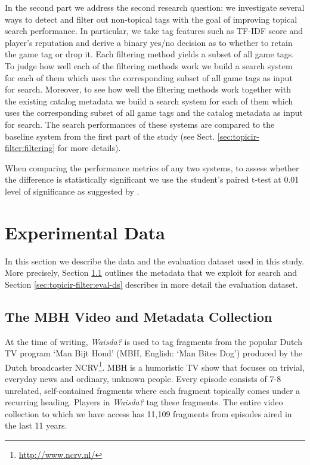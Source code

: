 In the second part we address the second research question: we investigate several ways to detect and filter out non-topical tags with the goal of improving topical search performance. In particular, we take tag features such as TF-IDF score and player's reputation and derive a binary yes/no decision as to whether to retain the game tag or drop it. Each filtering method yields a subset of all game tags. To judge how well each of the filtering methods work we build a search system for each of them which uses the corresponding subset of all game tags as input for search. Moreover, to see how well the filtering methods work together with the existing catalog metadata we build a search system for each of them which uses the corresponding subset of all game tags and the catalog metadata as input for search. The search performances of these systems are compared to the baseline system from the first part of the study (see Sect. \ref{sec:topicir-filter:filtering} for more details).

When comparing the performance metrics of any two systems, to assess whether the difference is statistically significant we use the student's paired t-test at 0.01 level of significance as suggested by \cite{stat-sig}.

\section{Experimental Data}
In this section we describe the data and the evaluation dataset used in this study. More precisely, Section \ref{sec:topicir-filter:video-metadata-collection} outlines the metadata that we exploit for search and Section \ref{sec:topicir-filter:eval-ds} describes in more detail the evaluation dataset.

\subsection{The MBH Video and Metadata Collection}\label{sec:topicir-filter:video-metadata-collection}
At the time of writing, \textit{Waisda?} is used to %
tag fragments from the popular Dutch TV program `Man Bijt Hond' (MBH, English: `Man Bites Dog') produced by the Dutch broadcaster NCRV\footnote{\url{http://www.ncrv.nl/}}.  MBH is a humoristic TV show that focuses on trivial, everyday news and ordinary, unknown people.  Every episode consists of 7-8 unrelated, self-contained fragments where each fragment topically comes under a recurring heading. Players in \textit{Waisda?} tag these fragments.  The entire video collection to which we have access has 11,109 fragments from episodes aired in the last 11 years.

